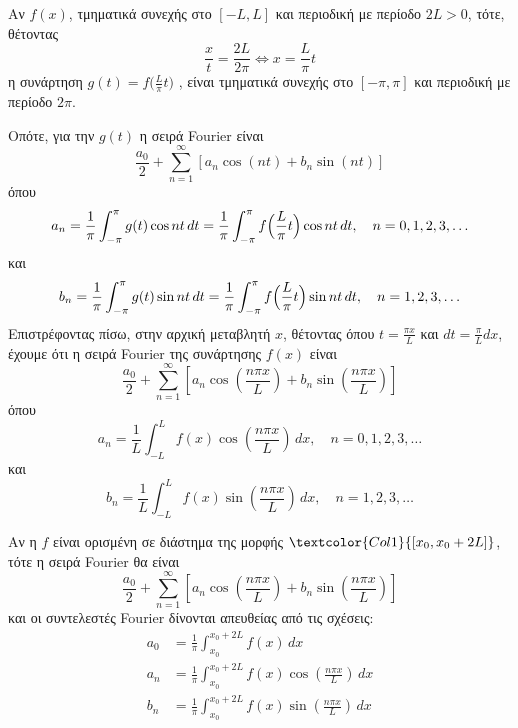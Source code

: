 \documentclass[a4paper,table]{report}
\begin{document}
      \begin{rem}
        Αν $ f(x) $, τμηματικά συνεχής στο $ [-L, L] $ και περιοδική  με περίοδο 
        $ 2L>0 $, τότε, θέτοντας 
        \[ 
          \frac{x}{t} = \frac{2L}{2 \pi} \Leftrightarrow \boxed{x= \frac{L}{\pi} t}
        \]
        η συνάρτηση $g(t) = f\bigl(\frac{L}{\pi}t\bigr)$ , είναι τμηματικά συνεχής στο 
        $ [- \pi , \pi] $ και περιοδική με περίοδο $ 2 \pi $.
      \end{rem}
      Οπότε, για την $ g(t) $ η σειρά Fourier είναι 
      \[
        \frac{a_{0}}{2} + \sum_{n=1}^{\infty} [a_{n} \cos{(nt)} + b_{n} \sin{(nt)}]
      \] 
      όπου 
      \[
        a_{n} = \frac{1}{\pi} \int _{- \pi}^{\pi} g(t) \cos{nt} \,{dt} = 
        \frac{1}{\pi} \int _{- \pi}^{\pi} f\Bigl(\frac{L}{\pi} t\Bigr) \cos{nt} \,{dt}, 
        \quad n = 0,1,2,3, \ldots
      \] 
      και 
      \[
        b_{n} = \frac{1}{\pi} \int _{- \pi}^{\pi} g(t) \sin{nt} \,{dt} = 
        \frac{1}{\pi} \int _{- \pi}^{\pi} f\Bigl(\frac{L}{\pi} t\Bigr) \sin{nt} \,{dt}, 
        \quad n = 1,2,3, \ldots
      \]
      Επιστρέφοντας πίσω, στην αρχική μεταβλητή $x$, θέτοντας όπου $ t = \frac{\pi x}{L} $ 
      και $ dt = \frac{\pi}{L} dx $, έχουμε ότι η σειρά Fourier της συνάρτησης $ f(x) $ είναι
      \[
        \boxed{\frac{a_{0}}{2} + \sum_{n=1}^{\infty} \left[a_{n} 
            \cos{\left(\frac{n \pi x}{L}\right)} + b_{n} 
        \sin{\left(\frac{n \pi x}{L}\right)} \right]}
      \]
      όπου 
      \[
        a_{n} = \frac{1}{L} \int _{- L}^{L} f(x) 
        \cos{\left(\frac{n \pi x}{L}\right)} \,{dx}, \quad n = 0,1,2,3, \ldots
      \] 
      και 
      \[
        b_{n} = \frac{1}{L} \int _{- L}^{L} f(x) 
        \sin{\left(\frac{n \pi x}{L}\right)} \,{dx}, \quad n = 1,2,3, \ldots
      \]

      \begin{rem}
        Αν η $f$ είναι ορισμένη σε διάστημα της μορφής 
        $\textcolor{Col1}{[x_{0}, x_{0}+2L]} $, τότε η σειρά Fourier θα είναι 
        \[
          \frac{a_{0}}{2} + \sum_{n=1}^{\infty} \left[a_{n} 
            \cos{\left(\frac{n \pi x}{L}\right)} + b_{n} 
          \sin{\left(\frac{n \pi x}{L}\right)} \right]
        \]
        και οι συντελεστές Fourier δίνονται απευθείας από τις σχέσεις:
        \begin{align*}
          a_{0} &= \frac{1}{\pi} \int _{x_{0}}^{x_{0}+ 2 L}f(x) \,{dx} \\
          a_{n} &= \frac{1}{\pi} \int _{x_{0}}^{x_{0}+ 2 L} f(x) \cos{\left(\frac{n \pi x}{L}\right)} \,{dx}  \\
          b_{n} &= \frac{1}{\pi} \int _{x_{0}}^{x_{0}+ 2 L} f(x) \sin{\left(\frac{n \pi x}{L}\right)} \,{dx}  
        \end{align*} 
      \end{rem}
\end{document}
